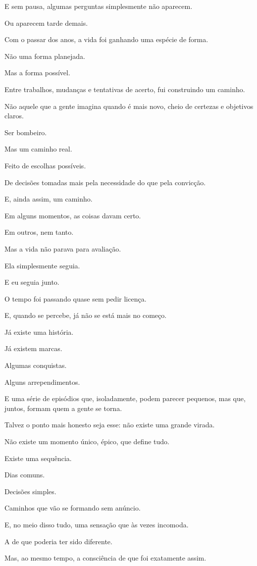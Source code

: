 E sem pausa, algumas perguntas simplesmente não aparecem.

Ou aparecem tarde demais.

Com o passar dos anos, a vida foi ganhando uma espécie de forma.

Não uma forma planejada.

Mas a forma possível.

Entre trabalhos, mudanças e tentativas de acerto, fui construindo um caminho. 

Não aquele que a gente imagina quando é mais novo, cheio de certezas e objetivos claros.

Ser bombeiro.

Mas um caminho real.

Feito de escolhas possíveis.

De decisões tomadas mais pela necessidade do que pela convicção.

E, ainda assim, um caminho.

Em alguns momentos, as coisas davam certo.

Em outros, nem tanto.

Mas a vida não parava para avaliação.

Ela simplesmente seguia.

E eu seguia junto.

O tempo foi passando quase sem pedir licença.

E, quando se percebe, já não se está mais no começo.

Já existe uma história.

Já existem marcas.

Algumas conquistas.

Alguns arrependimentos.

E uma série de episódios que, isoladamente, podem parecer pequenos, mas que, juntos, formam quem a gente se torna.

Talvez o ponto mais honesto seja esse: não existe uma grande virada.

Não existe um momento único, épico, que define tudo.

Existe uma sequência.

Dias comuns.

Decisões simples.

Caminhos que vão se formando sem anúncio.

E, no meio disso tudo, uma sensação que às vezes incomoda.

A de que poderia ter sido diferente.

Mas, ao mesmo tempo, a consciência de que foi exatamente assim.

